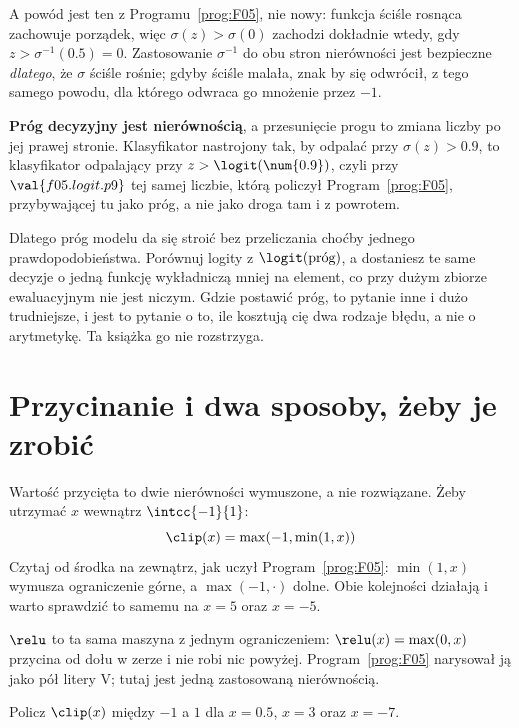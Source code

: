 \begin{fr}
A powód jest ten z Programu~\ref{prog:F05}, nie nowy: funkcja ściśle rosnąca
zachowuje porządek, więc $\sigma(z) > \sigma(0)$ zachodzi dokładnie wtedy, gdy
$z > \sigma^{-1}(\num{0.5}) = 0$. Zastosowanie $\sigma^{-1}$ do obu stron
nierówności jest bezpieczne \emph{dlatego}, że $\sigma$ ściśle rośnie; gdyby
ściśle malała, znak by się odwrócił, z tego samego powodu, dla którego odwraca
go mnożenie przez $-1$.

\textbf{Próg decyzyjny jest nierównością}, a przesunięcie progu to zmiana
liczby po jej prawej stronie. Klasyfikator nastrojony tak, by odpalać przy
$\sigma(z) > \num{0.9}$, to klasyfikator odpalający przy
$z > \logit(\num{0.9})$, czyli przy $\val{f05.logit.p9}$ \dash{} tej samej
liczbie, którą policzył Program~\ref{prog:F05}, przybywającej tu jako próg, a
nie jako droga tam i z powrotem.

\begin{note}
Dlatego próg modelu da się stroić bez przeliczania choćby jednego
prawdopodobieństwa. Porównuj logity z $\logit(\text{próg})$, a dostaniesz te
same decyzje o jedną funkcję wykładniczą mniej na element, co przy dużym
zbiorze ewaluacyjnym nie jest niczym. Gdzie postawić próg, to pytanie inne i
dużo trudniejsze, i jest to pytanie o to, ile kosztują cię dwa rodzaje błędu, a
nie o arytmetykę. Ta książka go nie rozstrzyga.
\end{note}
\end{fr}

\section{Przycinanie i dwa sposoby, żeby je zrobić}
\label{sec:F06-clipping}

\begin{fr}
Wartość przycięta to dwie nierówności wymuszone, a nie rozwiązane. Żeby
utrzymać $x$ wewnątrz $\intcc{-1}{1}$:
\[ \clip(x) = \max(-1, \min(1, x)) \]
Czytaj od środka na zewnątrz, jak uczył Program~\ref{prog:F05}: $\min(1, x)$
wymusza ograniczenie górne, a $\max(-1, \cdot)$ dolne. Obie kolejności
działają i warto sprawdzić to samemu na $x = 5$ oraz $x = -5$.

$\relu$ to ta sama maszyna z jednym ograniczeniem: $\relu(x) = \max(0, x)$
przycina od dołu w zerze i nie robi nic powyżej. Program~\ref{prog:F05}
narysował ją jako pół litery V; tutaj jest jedną zastosowaną nierównością.

Policz $\clip(x)$ między $-1$ a $1$ dla $x = \num{0.5}$, $x = 3$ oraz
$x = -7$.
\nextframe
\end{fr}

